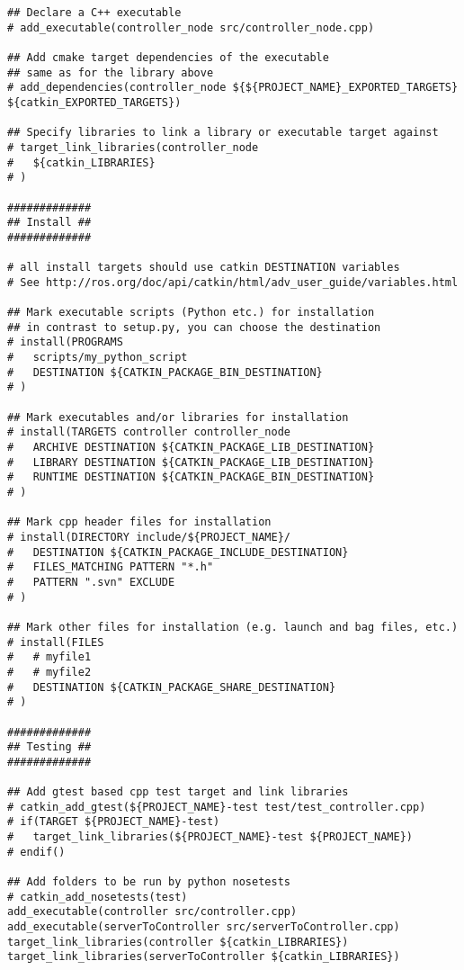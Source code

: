 \begin{lstlisting}
## Declare a C++ executable
# add_executable(controller_node src/controller_node.cpp)

## Add cmake target dependencies of the executable
## same as for the library above
# add_dependencies(controller_node ${${PROJECT_NAME}_EXPORTED_TARGETS} ${catkin_EXPORTED_TARGETS})

## Specify libraries to link a library or executable target against
# target_link_libraries(controller_node
#   ${catkin_LIBRARIES}
# )

#############
## Install ##
#############

# all install targets should use catkin DESTINATION variables
# See http://ros.org/doc/api/catkin/html/adv_user_guide/variables.html

## Mark executable scripts (Python etc.) for installation
## in contrast to setup.py, you can choose the destination
# install(PROGRAMS
#   scripts/my_python_script
#   DESTINATION ${CATKIN_PACKAGE_BIN_DESTINATION}
# )

## Mark executables and/or libraries for installation
# install(TARGETS controller controller_node
#   ARCHIVE DESTINATION ${CATKIN_PACKAGE_LIB_DESTINATION}
#   LIBRARY DESTINATION ${CATKIN_PACKAGE_LIB_DESTINATION}
#   RUNTIME DESTINATION ${CATKIN_PACKAGE_BIN_DESTINATION}
# )

## Mark cpp header files for installation
# install(DIRECTORY include/${PROJECT_NAME}/
#   DESTINATION ${CATKIN_PACKAGE_INCLUDE_DESTINATION}
#   FILES_MATCHING PATTERN "*.h"
#   PATTERN ".svn" EXCLUDE
# )

## Mark other files for installation (e.g. launch and bag files, etc.)
# install(FILES
#   # myfile1
#   # myfile2
#   DESTINATION ${CATKIN_PACKAGE_SHARE_DESTINATION}
# )

#############
## Testing ##
#############

## Add gtest based cpp test target and link libraries
# catkin_add_gtest(${PROJECT_NAME}-test test/test_controller.cpp)
# if(TARGET ${PROJECT_NAME}-test)
#   target_link_libraries(${PROJECT_NAME}-test ${PROJECT_NAME})
# endif()

## Add folders to be run by python nosetests
# catkin_add_nosetests(test)
add_executable(controller src/controller.cpp)
add_executable(serverToController src/serverToController.cpp)
target_link_libraries(controller ${catkin_LIBRARIES})
target_link_libraries(serverToController ${catkin_LIBRARIES})
\end{lstlisting}

